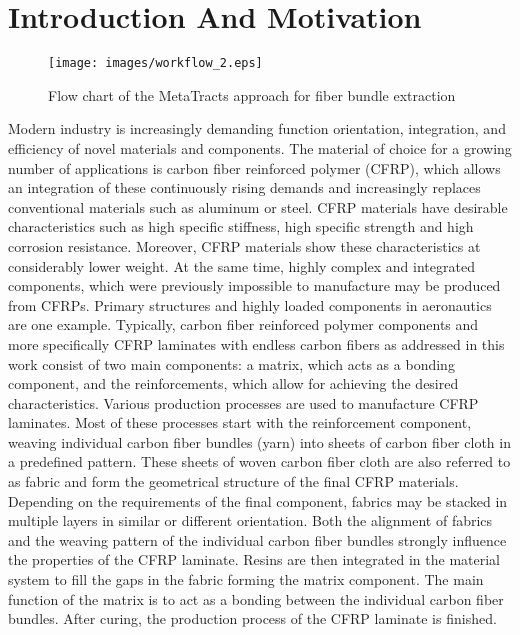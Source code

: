 \section{Introduction And Motivation}\label{sec:intro}
\begin{figure*}[tb]
	\centering
	\texttt{[image: images/workflow\_2.eps]}
	\caption{Flow chart of the MetaTracts approach for fiber bundle extraction}
	\label{fig:flowchart}
\end{figure*}
Modern industry is increasingly demanding function orientation, integration, and efficiency of novel materials and components. The material of choice for a growing number of applications is carbon fiber reinforced polymer (CFRP), which allows an integration of these continuously rising demands and increasingly replaces conventional materials such as aluminum or steel.
 CFRP materials have desirable characteristics such as high specific stiffness, high specific strength and high corrosion resistance. Moreover, CFRP materials show these characteristics at considerably lower weight. At the same time, highly complex and integrated components, which were previously impossible to manufacture may be produced from CFRPs. Primary structures and highly loaded components in aeronautics are one example. Typically, carbon fiber reinforced polymer components and more specifically CFRP laminates with endless carbon fibers as addressed in this work consist of two main components:
a matrix, which acts as a bonding component, and the reinforcements, which allow for achieving the desired characteristics. Various production processes are used to manufacture CFRP laminates. Most of these processes start with the reinforcement component, weaving individual carbon fiber bundles (yarn) into sheets of carbon fiber cloth in a predefined pattern. These sheets of woven carbon fiber cloth are also referred to as fabric and form the geometrical structure of the final CFRP materials. Depending on the requirements of the final component, fabrics may be stacked in multiple layers in similar or different orientation. Both the  alignment of fabrics and the weaving pattern of the individual carbon fiber bundles strongly influence the properties of the CFRP laminate. Resins are then integrated in the material system to fill the gaps in the fabric forming the matrix component. The main function of the matrix is to act as a bonding between the individual carbon fiber bundles. After curing, the production process of the CFRP laminate is finished.


